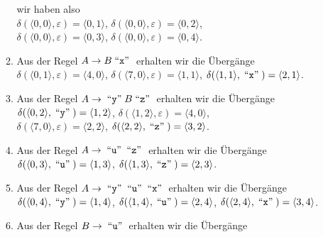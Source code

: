 \documentclass{article}
\def\pair(#1,#2){\langle #1, #2 \rangle}
\newcommand{\quoted}[1]{\;\mbox{``\texttt{#1}''}\;}
\begin{document}
\begin{enumerate}
\begin{enumerate}
            wir haben also
            \\[0.2cm]
            \hspace*{1.3cm} $\delta(\pair(0,0), \varepsilon) = \pair(0,1)$, \quad
                            $\delta(\pair(0,0), \varepsilon) = \pair(0,2)$, 
            \\[0.2cm]
            \hspace*{1.3cm} $\delta(\pair(0,0), \varepsilon) = \pair(0,3)$, \quad
                            $\delta(\pair(0,0), \varepsilon) = \pair(0,4)$.
      \item Aus der Regel $A \rightarrow B \quoted{x}$ erhalten wir die \"Uberg\"ange
            \\[0.2cm]
            \hspace*{1.3cm}
            $\delta(\pair(0,1), \varepsilon) = \pair(4,0)$, \quad
            $\delta(\pair(7,0), \varepsilon) = \pair(1,1)$, \quad
            $\delta(\pair(1,1), \quoted{x}) = \pair(2,1)$.
      \item Aus der Regel $A \rightarrow \quoted{y} B \quoted{z}$ erhalten wir die \"Uberg\"ange
            \\[0.2cm]
            \hspace*{1.3cm}
            $\delta(\pair(0,2), \quoted{y}) = \pair(1,2)$, \quad
            $\delta(\pair(1,2), \varepsilon) = \pair(4,0)$, \quad
            \\[0.2cm]
            \hspace*{1.3cm}
            $\delta(\pair(7,0), \varepsilon) = \pair(2,2)$, \quad
            $\delta(\pair(2,2), \quoted{z}) = \pair(3,2)$.
      \item Aus der Regel $A \rightarrow \quoted{u} \quoted{z}$ erhalten wir die \"Uberg\"ange
            \\[0.2cm]
            \hspace*{1.3cm}
            $\delta(\pair(0,3), \quoted{u}) = \pair(1,3)$, \quad
            $\delta(\pair(1,3), \quoted{z}) = \pair(2,3)$.
      \item Aus der Regel $A \rightarrow \quoted{y} \quoted{u} \quoted{x}$ erhalten wir die \"Uberg\"ange
            \\[0.2cm]
            \hspace*{1.3cm}
            $\delta(\pair(0,4), \quoted{y}) = \pair(1,4)$, \quad
            $\delta(\pair(1,4), \quoted{u}) = \pair(2,4)$, \quad
            $\delta(\pair(2,4), \quoted{x}) = \pair(3,4)$.
      \item Aus der Regel $B \rightarrow \quoted{u}$ erhalten wir die \"Uberg\"ange

\end{enumerate}
\end{enumerate}
\end{document}
